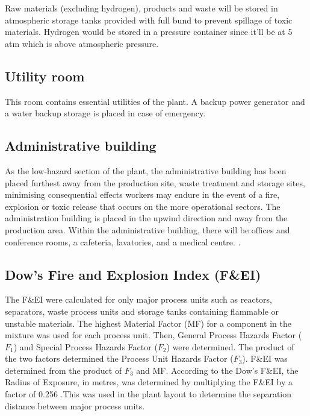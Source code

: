 Raw materials (excluding hydrogen), products and waste will be stored in atmospheric storage tanks provided with full bund to prevent spillage of toxic materials. Hydrogen would be stored in a pressure container since it'll be at 5 atm which is above atmospheric pressure.


\subsection{Utility room}
This room contains essential utilities of the plant. A backup power generator and a water backup storage is placed in case of emergency. 


\subsection{Administrative building}

As the low-hazard section of the plant, the administrative building has been placed furthest away from the production site, waste treatment and storage sites, minimising  consequential effects workers may endure in the event of a fire, explosion or toxic release that occurs on the more operational sectors. The administration building is placed in the upwind direction and away from the production area. Within the administrative building, there will be offices and conference rooms, a cafeteria, lavatories, and a medical centre. \cite{sinnott_coulson_2005}. 

\subsection{Dow's Fire and Explosion Index (F\&EI)}
The F\&EI were calculated for only major process units such as reactors, separators, waste process units and storage tanks containing flammable or unstable materials. The highest Material Factor (MF) for a component in the mixture was used for each process unit. Then, General Process Hazards Factor ($F_1$) and Special Process Hazards Factor ($F_2$) were determined. The product of the two factors determined the Process Unit Hazards Factor ($F_3$). F\&EI was determined from the product of $F_3$ and MF. According to the Dow's F\&EI, the Radius of Exposure, in metres, was determined by multiplying the F\&EI by a factor of 0.256 \cite{aiche_dows_1994}.This was used in the plant layout to determine the separation distance between major process units.    

